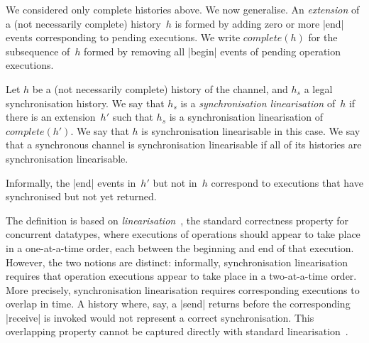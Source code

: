 We considered only complete histories above.  We now generalise.  An
\emph{extension} of a (not necessarily complete) history~$h$ is formed by
adding zero or more |end| events corresponding to pending executions.  We
write $complete(h)$ for the subsequence of~$h$ formed by removing all |begin|
events of pending operation executions.
%
\begin{definition}
Let $h$ be a (not necessarily complete) history of the channel, and $h_s$ a
legal synchronisation history.  We say that $h_s$ is a \emph{synchronisation
  linearisation} of~$h$ if there is an extension~$h'$ such that $h_s$ is a
synchronisation linearisation of $complete(h')$.  We say that $h$ is
synchronisation linearisable in this case.
%
We say that a synchronous channel is synchronisation linearisable if all of
its histories are synchronisation linearisable.
\end{definition}
%
Informally, the |end| events in~$h'$ but not in~$h$ correspond to executions
that have synchronised but not yet returned. 



The definition is based on \emph{linearisation}~\cite{herlihy-wing}, the
standard correctness property for concurrent datatypes, where executions of
operations should appear to take place in a one-at-a-time order, each between
the beginning and end of that execution.  However, the two notions are
distinct: informally, synchronisation linearisation requires that operation
executions appear to take place in a two-at-a-time order.  More precisely,
synchronisation linearisation requires corresponding executions to overlap in
time.  A history where, say, a |send| returns before the corresponding
|receive| is invoked would not represent a correct synchronisation.  This
overlapping property cannot be captured directly with standard
linearisation~\cite{LL:synchronisation}.


